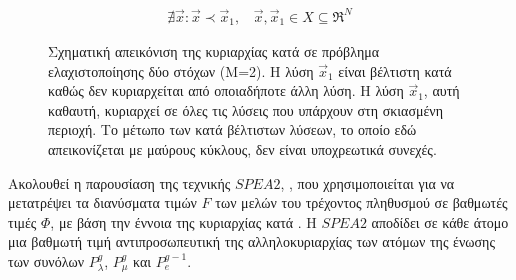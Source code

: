 \begin{eqnarray}
    \nexists\vec{x}:\vec{x}\prec\vec{x}_1, ~~~~ \vec{x},\vec{x}_1\in X \!\subseteq\! \Re^{N}
\end{eqnarray}


\begin{figure}[h!]
\begin{minipage}[b]{1\linewidth}
 \centering
\end{minipage}
\caption{Σχηματική απεικόνιση της κυριαρχίας κατά  σε πρόβλημα ελαχιστοποίησης δύο στόχων (Μ=2). Η λύση $\vec{x}_1$ είναι βέλτιστη κατά  καθώς δεν κυριαρχείται από οποιαδήποτε άλλη λύση. Η λύση $\vec{x}_1$, αυτή καθαυτή, κυριαρχεί σε όλες τις λύσεις που υπάρχουν στη σκιασμένη περιοχή. Το μέτωπο των κατά  βέλτιστων λύσεων, το οποίο εδώ απεικονίζεται με μαύρους κύκλους, δεν είναι υποχρεωτικά συνεχές.} 
\label{Pareto2}
\end{figure}

Ακολουθεί η παρουσίαση της τεχνικής $SPEA2$, \cite{Zitz02,Zitz01}, που χρησιμοποιείται για να μετατρέψει τα διανύσματα τιμών $F$ των μελών του τρέχοντος πληθυσμού σε βαθμωτές τιμές $\Phi$, με βάση την έννοια της κυριαρχίας κατά . Η $SPEA2$ αποδίδει σε κάθε άτομο μια βαθμωτή τιμή αντιπροσωπευτική της αλληλοκυριαρχίας των ατόμων της ένωσης των συνόλων $P_{\lambda}^g$, $P_{\mu}^g$ και $P_{e}^{g-1}$.   

